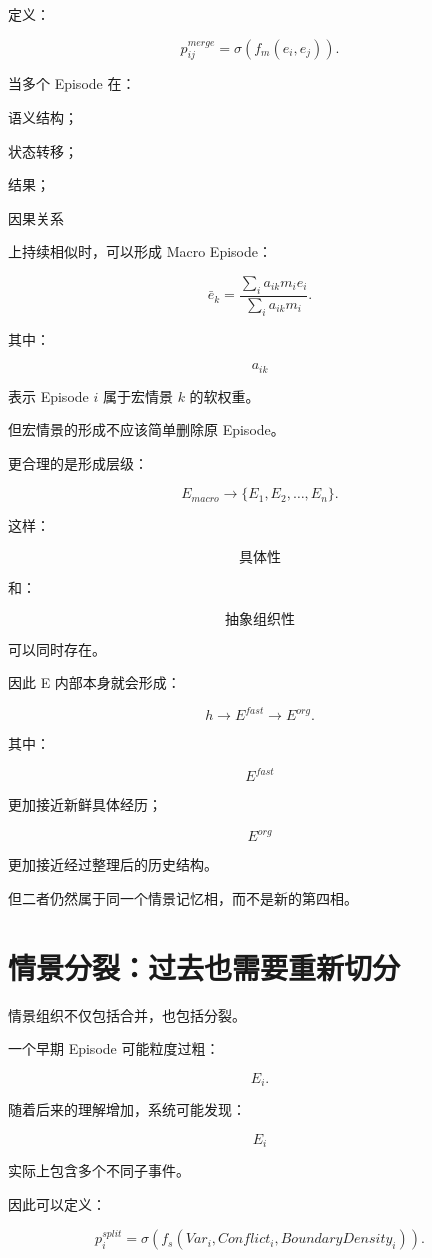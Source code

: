 定义：

\[
p_{ij}^{merge}
=
\sigma
\left(
f_m(e_i,e_j)
\right).
\]

当多个 Episode 在：

语义结构；

状态转移；

结果；

因果关系

上持续相似时，可以形成 Macro Episode：

\[
\boxed{
\bar e_k
=
\frac{
\sum_i a_{ik}m_ie_i
}{
\sum_i a_{ik}m_i
}.
}
\]

其中：

\[
a_{ik}
\]

表示 Episode \(i\) 属于宏情景 \(k\) 的软权重。

但宏情景的形成不应该简单删除原 Episode。

更合理的是形成层级：

\[
\boxed{
E_{macro}
\rightarrow
\{
E_1,E_2,\ldots,E_n
\}.
}
\]

这样：

\[
\boxed{
\text{具体性}
}
\]

和：

\[
\boxed{
\text{抽象组织性}
}
\]

可以同时存在。

因此 E 内部本身就会形成：

\[
\boxed{
h
\rightarrow
E^{fast}
\rightarrow
E^{org}.
}
\]

其中：

\[
E^{fast}
\]

更加接近新鲜具体经历；

\[
E^{org}
\]

更加接近经过整理后的历史结构。

但二者仍然属于同一个情景记忆相，而不是新的第四相。


\section{情景分裂：过去也需要重新切分}

情景组织不仅包括合并，也包括分裂。

一个早期 Episode 可能粒度过粗：

\[
E_i.
\]

随着后来的理解增加，系统可能发现：

\[
E_i
\]

实际上包含多个不同子事件。

因此可以定义：

\[
p_i^{split}
=
\sigma
\left(
f_s(
Var_i,
Conflict_i,
BoundaryDensity_i
)
\right).
\]

